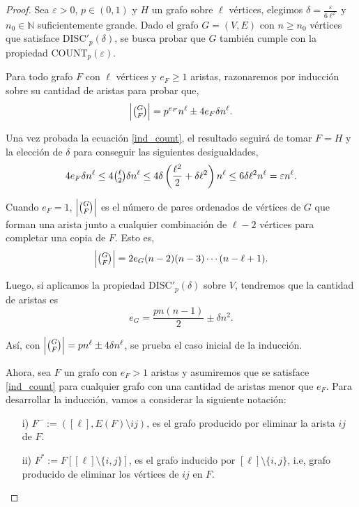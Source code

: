 \documentclass{article}[14pts]
\newcommand{\discp}{\mathrm{DISC'}}
\newcommand{\Count}{\mathrm{COUNT}}
\let\varepsilon=\varepsilon
\begin{document}
\begin{proof}
    Sea $\varepsilon > 0$, $p\in (0,1)$ y $H$ un grafo sobre $\ell$ vértices, elegimos $\delta = \frac{\varepsilon}{6\ell^{2}}$ y $n_0\in \mathbb{N}$ suficientemente grande. Dado el grafo $G=(V,E)$ con $n\geq n_0$ vértices que satisface $\discp_p(\delta)$, se busca probar que $G$ también cumple con la propiedad $\Count_p(\varepsilon)$.

    Para todo grafo $F$ con $\ell$ vértices y $e_F \geq 1$ aristas, razonaremos por inducción sobre su cantidad de aristas para probar que,
    \begin{equation} \label{ind_count}
        \left| \tbinom{G}{F}\right| = p^{e_F}n^{\ell} \pm 4e_F \delta n^{\ell}.
    \end{equation}

    Una vez probada la ecuación \eqref{ind_count}, el resultado seguirá de tomar $F = H$ y la elección de $\delta$ para conseguir las siguientes desigualdades,
    \begin{equation*}
        4e_F \delta n^{\ell} \leq 4\tbinom{\ell}{2}\delta n^{\ell} \leq 4\delta\left( \frac{\ell^{2}}{2} + \delta\ell^{2}\right)n^{\ell} \leq 6\delta\ell^{2}n^{\ell} = \varepsilon n^{\ell}.
    \end{equation*}

    Cuando $e_F = 1$, $\left| \tbinom{G}{F}\right|$ es el número de pares ordenados de vértices de $G$ que forman una arista junto a cualquier combinación de $\ell -2$ vértices para completar una copia de $F$. Esto es,
    \begin{equation*}
        \left| \tbinom{G}{F}\right| = 2e_G(n-2)(n-3)\cdots(n-\ell + 1).
    \end{equation*}
    
    Luego, si aplicamos la propiedad $\discp_p(\delta)$ sobre $V$, tendremos que la cantidad de aristas es
    \begin{equation*}
        e_G = \frac{pn(n-1)}{2} \pm \delta n^{2}.
    \end{equation*}

    Así, con $\left| \tbinom{G}{F}\right| = pn^{\ell} \pm 4\delta n^{\ell}$, se prueba el caso inicial de la inducción.
    \medskip

    Ahora, sea $F$ un grafo con $e_F > 1$ aristas y asumiremos que se satisface \eqref{ind_count} para cualquier grafo con una cantidad de aristas menor que $e_F$. Para desarrollar la inducción, vamos a considerar la siguiente notación:
    \begin{enumerate}
        \item[i)] $F^{-} := ([\ell], E(F)\setminus ij)$, es el grafo producido por eliminar la arista $ij$ de $F$.
        \item[ii)] $F^{*} := F[[\ell]\setminus \lbrace i,j\rbrace]$, es el grafo inducido por $[\ell]\setminus \lbrace i,j\rbrace$, i.e, grafo producido de eliminar los vértices de $ij$ en $F$. 
    \end{enumerate}


\end{proof}
\end{document}

